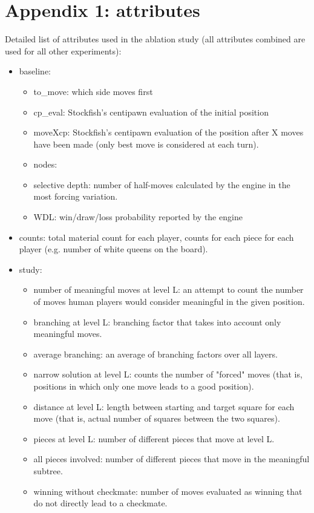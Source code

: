 \documentclass[11pt]{article}
\begin{document}
\section*{Appendix 1: attributes}
\label{app1}

Detailed list of attributes used in the ablation study (all attributes combined are used for all other experiments):
\begin{itemize}
\item baseline: 
\begin{itemize}
\item to\_move: which side moves first
\item cp\_eval: Stockfish's centipawn evaluation of the initial position
\item moveXcp: Stockfish's centipawn evaluation of the position after X moves have been made (only best move is considered at each turn).
\item nodes:
\item selective depth: number of half-moves calculated by the engine in the most forcing variation.
\item WDL: win/draw/loss probability reported by the engine
\end{itemize}
\item counts: total material count for each player, counts for each piece for each player (e.g. number of white queens on the board). 
\item study:
\begin{itemize}
\item number of meaningful moves at level L: an attempt to count the number of moves human players would consider meaningful in the given position.
\item branching at level L: branching factor that takes into account only meaningful moves. 
\item average branching: an average of branching factors over all layers.
\item narrow solution at level L: counts the number of "forced" moves (that is, positions in which only one move leads to a good position). 
\item distance at level L: length between starting and target square for each move (that is, actual number of squares between the two squares).
\item pieces at level L: number of different pieces that move at level L.
\item all pieces involved: number of different pieces that move in the meaningful subtree. 
\item winning without checkmate: number of moves evaluated as winning that do not directly lead to a checkmate.

\end{itemize}
\end{itemize}
\end{document}
